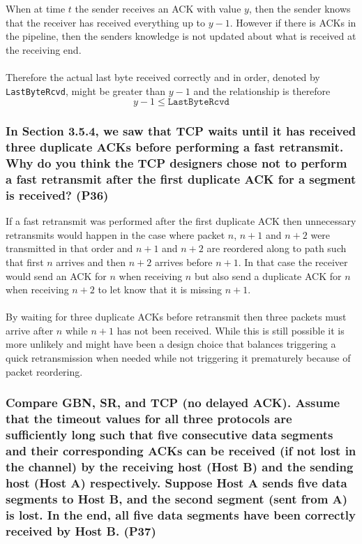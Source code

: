 When at time $t$ the sender receives an ACK with value $y$, then the sender knows that the receiver has received everything up to $y-1$. However if there is ACKs in the pipeline, then the senders knowledge is not updated about what is received at the receiving end. \\
\\
Therefore the actual last byte received correctly and in order, denoted by \texttt{LastByteRcvd}, might be greater than $y-1$ and the relationship is therefore
\begin{equation*}
    y-1 \leq \texttt{LastByteRcvd}
\end{equation*}



\subsubsection{In Section 3.5.4, we saw that TCP waits until it has received three duplicate ACKs before performing a fast retransmit. Why do you think the TCP designers chose not to perform a fast retransmit after the first duplicate ACK for a segment is received? (P36)}

If a fast retransmit was performed after the first duplicate ACK then unnecessary retransmits would happen in the case where packet $n$, $n+1$ and $n+2$ were transmitted in that order and $n+1$ and $n+2$ are reordered along to path such that first $n$ arrives and then $n+2$ arrives before $n+1$. In that case the receiver would send an ACK for $n$ when receiving $n$ but also send a duplicate ACK for $n$ when receiving $n+2$ to let know that it is missing $n+1$.\\
\\
By waiting for three duplicate ACKs before retransmit then three packets must arrive after $n$ while $n+1$ has not been received. While this is still possible it is more unlikely and might have been a design choice that balances triggering a quick retransmission when needed while not triggering it prematurely because of packet reordering. 


\subsubsection{Compare GBN, SR, and TCP (no delayed ACK). Assume that the timeout values for all three protocols are sufficiently long such that five consecutive data segments and their corresponding ACKs can be received (if not lost in the channel) by the receiving host (Host B) and the sending host (Host A) respectively. Suppose Host A sends five data segments to Host B, and the second segment (sent from A) is lost. In the end, all five data segments have been correctly received by Host B. (P37)}

